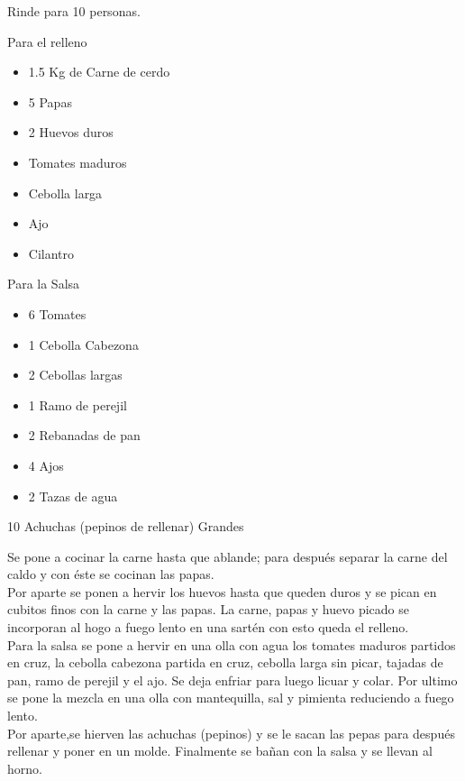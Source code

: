 
Rinde para 10 personas.\\

\begin{ingredientes}
\item Para el relleno
\begin{itemize}
\item 1.5 Kg de Carne de cerdo
\item 5 Papas
\item 2 Huevos duros
\item Tomates maduros
\item Cebolla larga
\item Ajo
\item Cilantro
\end{itemize}
\item Para la Salsa
\begin{itemize}
\item 6 Tomates
\item 1 Cebolla Cabezona
\item 2 Cebollas largas
\item 1 Ramo de perejil
\item 2 Rebanadas de pan
\item 4 Ajos
\item 2 Tazas de agua
\end{itemize}
\item 10 Achuchas (pepinos de rellenar) Grandes
\end{ingredientes}
\preparacion

Se pone a cocinar la carne hasta que ablande; para después separar la carne del caldo y con éste se cocinan las papas. \\

Por aparte se ponen a hervir los huevos hasta que queden duros y se pican en cubitos finos con la carne y las papas. La carne, papas y huevo picado se incorporan al hogo a fuego lento en una sartén con esto queda el relleno.\\

Para la salsa se pone a hervir en una olla con agua los tomates maduros partidos en cruz, la cebolla cabezona partida en cruz, cebolla larga sin picar, tajadas de pan, ramo de perejil y el ajo. Se deja enfriar para luego licuar y colar. Por ultimo se pone la mezcla en una olla con mantequilla, sal y pimienta reduciendo a fuego lento.\\

Por aparte,se hierven las achuchas (pepinos) y se le sacan las pepas para después rellenar y poner en un molde. Finalmente se bañan con la salsa y se llevan al horno.